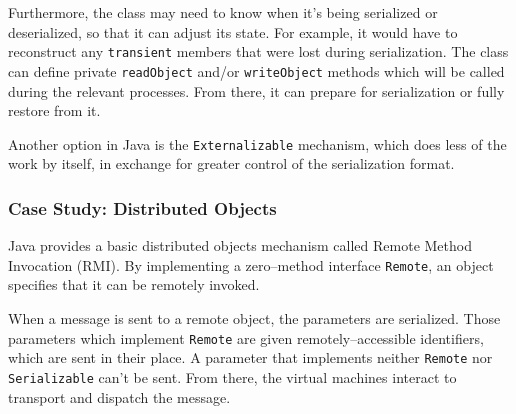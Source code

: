 Furthermore, the class may need to know when it's being serialized or
deserialized, so that it can adjust its state. For example, it would have to
reconstruct any \texttt{transient} members that were lost during
serialization. The class can define private \texttt{readObject} and/or
\texttt{writeObject} methods which will be called during the relevant
processes. From there, it can prepare for serialization or fully restore from
it.

Another option in Java is the \texttt{Externalizable} mechanism, which does
less of the work by itself, in exchange for greater control of the
serialization format.


\subsubsection{Case Study: Distributed Objects}

Java provides a basic distributed objects mechanism called Remote Method
Invocation (RMI)\cite{java-rmi}. By implementing a zero--method interface
\texttt{Remote}, an object specifies that it can be remotely invoked.

When a message is sent to a remote object, the parameters are serialized.
Those parameters which implement \texttt{Remote} are given
remotely--accessible identifiers, which are sent in their place. A parameter
that implements neither \texttt{Remote} nor \texttt{Serializable} can't be
sent. From there, the virtual machines interact to transport and dispatch the
message.
